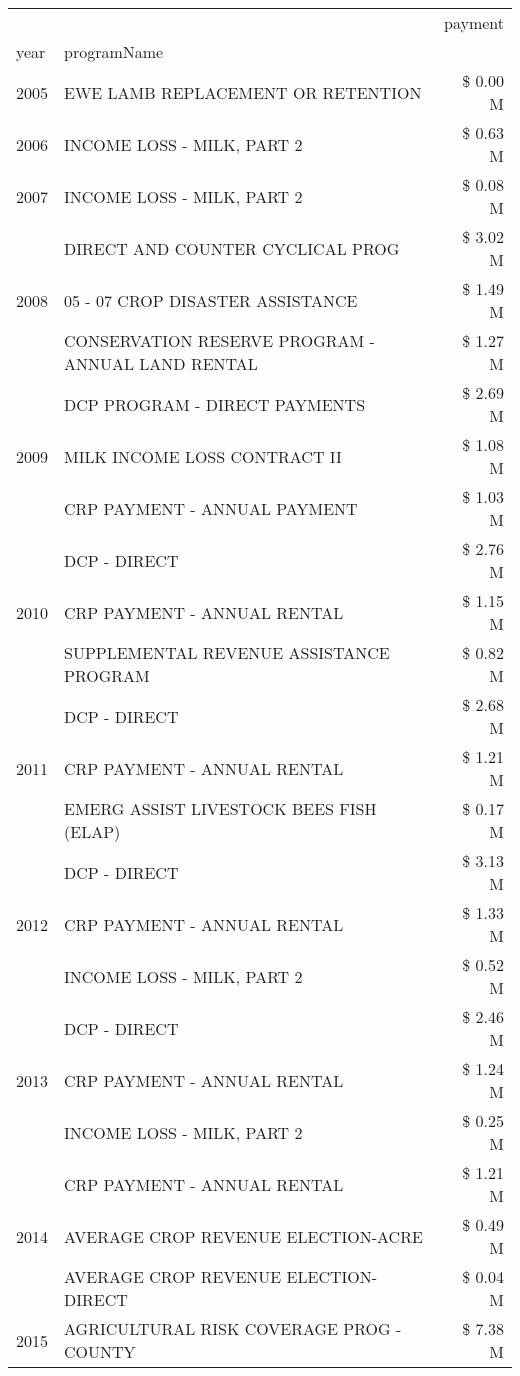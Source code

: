 \begin{tabular}{llr}
\toprule
 &  & payment \\
year & programName &  \\
\midrule
2005 & EWE LAMB REPLACEMENT OR RETENTION & \$ 0.00 M \\
\cline{1-3}
2006 & INCOME LOSS - MILK, PART 2 & \$ 0.63 M \\
\cline{1-3}
2007 & INCOME LOSS - MILK, PART 2 & \$ 0.08 M \\
\cline{1-3}
\multirow[t]{3}{*}{2008} & DIRECT AND COUNTER CYCLICAL PROG & \$ 3.02 M \\
 & 05 - 07 CROP DISASTER ASSISTANCE & \$ 1.49 M \\
 & CONSERVATION RESERVE PROGRAM - ANNUAL LAND RENTAL & \$ 1.27 M \\
\cline{1-3}
\multirow[t]{3}{*}{2009} & DCP PROGRAM - DIRECT PAYMENTS & \$ 2.69 M \\
 & MILK INCOME LOSS CONTRACT II & \$ 1.08 M \\
 & CRP PAYMENT - ANNUAL PAYMENT & \$ 1.03 M \\
\cline{1-3}
\multirow[t]{3}{*}{2010} & DCP - DIRECT & \$ 2.76 M \\
 & CRP PAYMENT - ANNUAL RENTAL & \$ 1.15 M \\
 & SUPPLEMENTAL REVENUE ASSISTANCE PROGRAM & \$ 0.82 M \\
\cline{1-3}
\multirow[t]{3}{*}{2011} & DCP - DIRECT & \$ 2.68 M \\
 & CRP PAYMENT - ANNUAL RENTAL & \$ 1.21 M \\
 & EMERG ASSIST LIVESTOCK BEES FISH (ELAP) & \$ 0.17 M \\
\cline{1-3}
\multirow[t]{3}{*}{2012} & DCP - DIRECT & \$ 3.13 M \\
 & CRP PAYMENT - ANNUAL RENTAL & \$ 1.33 M \\
 & INCOME LOSS - MILK, PART 2 & \$ 0.52 M \\
\cline{1-3}
\multirow[t]{3}{*}{2013} & DCP - DIRECT & \$ 2.46 M \\
 & CRP PAYMENT - ANNUAL RENTAL & \$ 1.24 M \\
 & INCOME LOSS - MILK, PART 2 & \$ 0.25 M \\
\cline{1-3}
\multirow[t]{3}{*}{2014} & CRP PAYMENT - ANNUAL RENTAL & \$ 1.21 M \\
 & AVERAGE CROP REVENUE ELECTION-ACRE & \$ 0.49 M \\
 & AVERAGE CROP REVENUE ELECTION-DIRECT & \$ 0.04 M \\
\cline{1-3}
\multirow[t]{3}{*}{2015} & AGRICULTURAL RISK COVERAGE PROG - COUNTY & \$ 7.38 M \\

\end{tabular}
